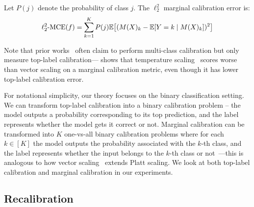 \begin{definition}
\label{dfn:marginal-ce}
Let $P(j)$ denote the probability of class $j$. The $\ell_2^2$ marginal calibration error is:
\begin{align}
\ell_2^2\mbox{-MCE}(f) = \sum_{k = 1}^K P(j) \mathbb{E}\big[ (M(X)_k - \mathbb{E}[Y = k \mid M(X)_k])^2 \big]
\end{align}
\end{definition}

Note that prior works~\cite{guo2017calibration, hendrycks2019anomaly, hendrycks2019pretraining} often claim to perform multi-class  calibration but only measure top-label calibration---\cite{nixon2019calibration} shows that temperature scaling~\cite{guo2017calibration} scores worse than vector scaling on a marginal calibration metric, even though it has lower top-label calibration error.


For notational simplicity, our theory focuses on the binary classification setting. We can transform top-label calibration into a binary calibration problem -- the model outputs a probability corresponding to its top prediction, and the label represents whether the model gets it correct or not. Marginal calibration can be transformed into $K$ one-vs-all binary calibration problems where for each $k \in [K]$ the model outputs the probability associated with the $k$-th class, and the label represents whether the input belongs to the $k$-th class or not~\cite{zadrozny2002transforming}---this is analogous to how vector scaling~\cite{guo2017calibration} extends Platt scaling. We look at both top-label calibration and marginal calibration in our experiments.


\subsection{Recalibration}

